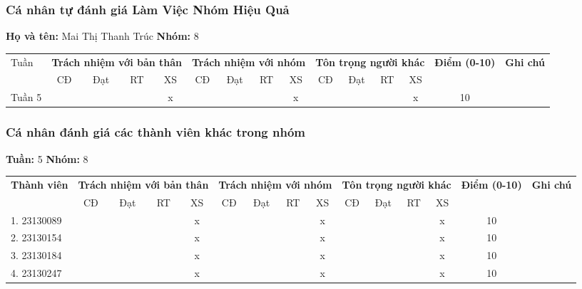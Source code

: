 \subsubsection*{Cá nhân tự đánh giá Làm Việc Nhóm Hiệu Quả}

\noindent \textbf{Họ và tên:} Mai Thị Thanh Trúc \hrulefill \quad \textbf{Nhóm:} 8 \hrulefill

\vspace{0.5cm}

\begin{tabularx}{\linewidth}{|X|c|c|c|c|c|c|c|c|c|c|c|c|c|c|}
\hline
Tuần & \multicolumn{4}{c|}{\textbf{Trách nhiệm với bản thân}} & \multicolumn{4}{c|}{\textbf{Trách nhiệm với nhóm}} & \multicolumn{4}{c|}{\textbf{Tôn trọng người khác}} & \multirow{2}{1.5cm}{\textbf{Điểm (0-10)}} & \multirow{2}{1.5cm}{\textbf{Ghi chú}} \\ \cline{2-13}
 & CĐ & Đạt & RT & XS & CĐ & Đạt & RT & XS & CĐ & Đạt & RT & XS & & \\ \hline
  Tuần 5 & & & & x & & & & x & & & & x & 10 & \\ \hline
\end{tabularx}

\vspace{1cm}

\subsubsection*{Cá nhân đánh giá các thành viên khác trong nhóm}

\noindent \textbf{Tuần:} 5 \hrulefill \quad \textbf{Nhóm:} 8 \hrulefill

\vspace{0.5cm}

\begin{tabularx}{\linewidth}{|X|c|c|c|c|c|c|c|c|c|c|c|c|c|c|}
\hline
\multirow{2}{3cm}{\textbf{Thành viên}} & \multicolumn{4}{c|}{\textbf{Trách nhiệm với bản thân}} & \multicolumn{4}{c|}{\textbf{Trách nhiệm với nhóm}} & \multicolumn{4}{c|}{\textbf{Tôn trọng người khác}} & \multirow{2}{1.2cm}{\textbf{Điểm (0-10)}} & \multirow{2}{1.5cm}{\textbf{Ghi chú}} \\ \cline{2-13}
 & CĐ & Đạt & RT & XS & CĐ & Đạt & RT & XS & CĐ & Đạt & RT & XS & & \\ \hline
1. 23130089 & & & & x & & & & x & & & & x & 10 & \\ \hline
2. 23130154 & & & & x & & & & x & & & & x & 10 & \\ \hline
3. 23130184 & & & & x & & & & x & & & & x & 10 & \\ \hline
4. 23130247 & & & & x & & & & x & & & & x & 10 & \\ \hline
\end{tabularx}
